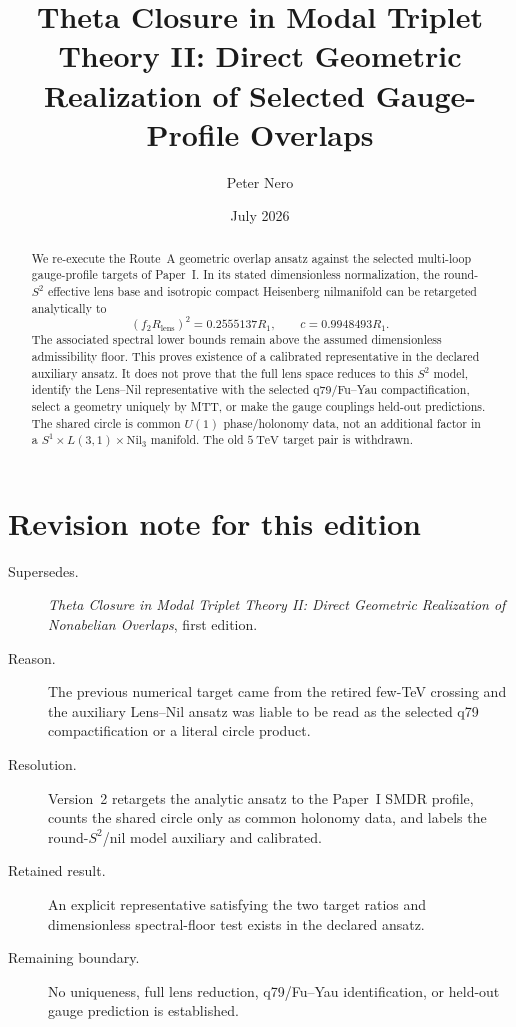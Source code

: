 \documentclass[11pt]{article}
\title{Theta Closure in Modal Triplet Theory II:
Direct Geometric Realization of Selected Gauge-Profile Overlaps}
\author{Peter Nero}
\date{July 2026}
\begin{document}
\maketitle

\begin{abstract}
We re-execute the Route~A geometric overlap ansatz against the selected
multi-loop gauge-profile targets of Paper~I.  In its stated dimensionless
normalization, the round-$S^2$ effective lens base and isotropic compact
Heisenberg nilmanifold can be retargeted analytically to
\[
 (f_2R_{\mathrm{lens}})^2=0.2555137R_1,
 \qquad c=0.9948493R_1.
\]
The associated spectral lower bounds remain above the assumed dimensionless
admissibility floor. This proves existence of a calibrated representative in
the declared auxiliary ansatz. It does not prove that the full lens space
reduces to this $S^2$ model, identify the Lens--Nil representative with the
selected q79/Fu--Yau compactification, select a geometry uniquely by MTT, or
make the gauge couplings held-out predictions. The shared circle is common
$U(1)$ phase/holonomy data, not an additional factor in a
$S^1\times L(3,1)\times\mathrm{Nil}_3$ manifold. The old
$5~\mathrm{TeV}$ target pair is withdrawn.
\end{abstract}

\section*{Revision note for this edition}
\begin{description}
\item[Supersedes.] \emph{Theta Closure in Modal Triplet Theory II: Direct
Geometric Realization of Nonabelian Overlaps}, first edition.
\item[Reason.] The previous numerical target came from the retired few-TeV
crossing and the auxiliary Lens--Nil ansatz was liable to be read as the
selected q79 compactification or a literal circle product.
\item[Resolution.] Version~2 retargets the analytic ansatz to the Paper~I
SMDR profile, counts the shared circle only as common holonomy data, and labels
the round-$S^2$/nil model auxiliary and calibrated.
\item[Retained result.] An explicit representative satisfying the two target
ratios and dimensionless spectral-floor test exists in the declared ansatz.
\item[Remaining boundary.] No uniqueness, full lens reduction, q79/Fu--Yau
identification, or held-out gauge prediction is established.
\end{description}
\end{document}
